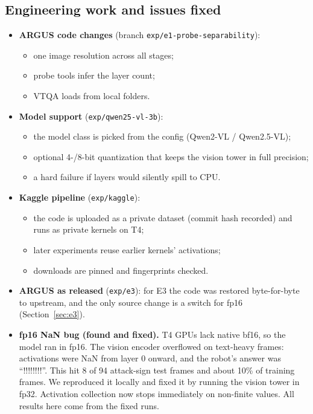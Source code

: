 \documentclass[11pt,a4paper]{article}
\newcommand{\code}[1]{\texttt{#1}}
\begin{document}
\subsection{Engineering work and issues fixed}
\begin{itemize}
\item \textbf{ARGUS code changes} (branch \code{exp/e1-probe-separability}):
  \begin{itemize}
  \item one image resolution across all stages;
  \item probe tools infer the layer count;
  \item VTQA loads from local folders.
  \end{itemize}
\item \textbf{Model support} (\code{exp/qwen25-vl-3b}):
  \begin{itemize}
  \item the model class is picked from the config (Qwen2-VL / Qwen2.5-VL);
  \item optional 4-/8-bit quantization that keeps the vision tower in full precision;
  \item a hard failure if layers would silently spill to CPU.
  \end{itemize}
\item \textbf{Kaggle pipeline} (\code{exp/kaggle}):
  \begin{itemize}
  \item the code is uploaded as a private dataset (commit hash recorded) and runs as private kernels on T4;
  \item later experiments reuse earlier kernels' activations;
  \item downloads are pinned and fingerprints checked.
  \end{itemize}
\item \textbf{ARGUS as released} (\code{exp/e3}): for E3 the code was restored byte-for-byte to upstream, and the only source change is a switch for fp16 (Section~\ref{sec:e3}).
\item \textbf{fp16 NaN bug (found and fixed).} T4 GPUs lack native bf16, so the model ran in fp16. The vision encoder
overflowed on text-heavy frames: activations were NaN from layer 0 onward, and the robot's answer was ``!!!!!!!!''. This hit 8 of 94
attack-sign test frames and about 10\% of training frames. We reproduced it locally and fixed it by running the vision tower in fp32. Activation
collection now stops immediately on non-finite values. All results here come from the fixed runs.
\end{itemize}
\end{document}
